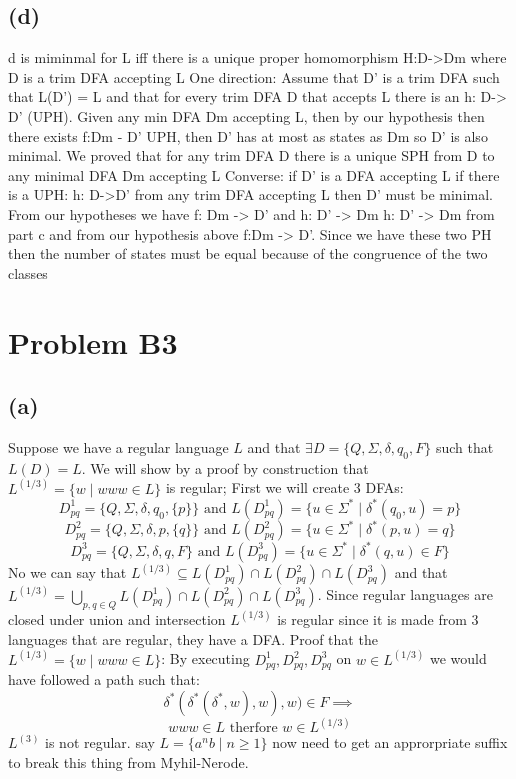 \documentclass[12pt]{article}
\begin{document}
\subsection*{(d)}
d is miminmal for L iff there is a unique proper homomorphism
H:D->Dm where D is a trim DFA accepting L
	One direction:
		Assume that D' is a trim DFA such that L(D') = L and
		that for every trim DFA D that accepts L there is an h: D-> D' (UPH).
		Given any min DFA Dm accepting L, then by our hypothesis then there
		exists f:Dm - D' UPH, then D' has at most as states as Dm so D' is also
		minimal.
	We proved that for any trim DFA D there is a unique SPH from D to any
	minimal DFA Dm accepting L
Converse: if D' is a DFA accepting L if there is a UPH: h: D->D' from any trim
DFA accepting L then D' must be minimal.
	From our hypotheses we have f: Dm -> D' and h: D' -> Dm
	h: D' -> Dm from part c and from our hypothesis above f:Dm -> D'.
	Since we have these two PH then the number of states must be equal because
	of the congruence of the two classes

\section*{Problem B3}
\subsection*{(a)}
Suppose we have a regular language $L$ and that $\exists
D = \{Q, \Sigma, \delta, q_0, F\}$ such that $L(D) = L$.
We will show by a proof by construction that
$L^{(1/3)} = \{ w \mid www \in L\}$ is regular;
\newline First we will create 3 DFAs:
$$D^1_{pq} = \{Q, \Sigma, \delta, q_0, \{p\}\} \text{ and }
L(D^1_{pq}) = \{u \in \Sigma^* \mid \delta^* (q_0,u) = p\}$$
$$D^2_{pq} = \{Q, \Sigma, \delta, p, \{q\}\} \text{ and }
L(D^2_{pq}) = \{u \in \Sigma^* \mid \delta^* (p,u) = q\}$$
$$D^3_{pq} = \{Q, \Sigma, \delta, q, F\} \text{ and }
L(D^3_{pq}) = \{u \in \Sigma^* \mid \delta^* (q,u) \in F\}$$
No we can say that
$L^{(1/3)} \subseteq L(D^1_{pq}) \cap L(D^2_{pq}) \cap L(D^3_{pq})$ and that
$L^{(1/3)} = \bigcup_{p,q \in Q}
L(D^1_{pq}) \cap L(D^2_{pq}) \cap L(D^3_{pq})$.
Since regular languages are closed under union and intersection
$L^{(1/3)}$ is regular since it is made from 3 languages that are regular,
they have a DFA. \newline
Proof that the $L^{(1/3)} = \{ w \mid www \in L\}$:\newline
By executing  $D^1_{pq} , D^2_{pq} , D^3_{pq}$ on $w \in L^{(1/3)}$
we would have followed a path such that:
$$\delta^*(\delta^*(\delta^*, w), w), w) \in F \implies$$
$$www \in L \text{ therfore }w \in L^{(1/3)}$$
\newline $L^{(3)}$ is not regular. say $L = \{a^nb \mid n \ge 1\}$
now need to get an approrpriate suffix to break this thing from Myhil-Nerode.
\end{document}
